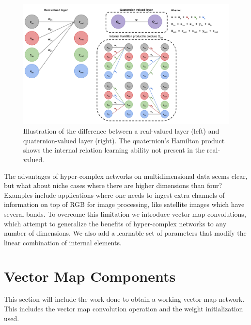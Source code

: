 \documentclass[14pt,a4paper]{article}
\begin{document}
\begin{figure}
	\centering
		\includegraphics[width=1.0\columnwidth]{figures/RealToQuaternion.pdf}
		\caption{Illustration of the difference between a real-valued layer (left) and quaternion-valued layer (right). The quaternion's Hamilton product shows the internal relation learning ability not present in the real-valued.}
	\label{f:hamilton}
\end{figure}

The advantages of hyper-complex networks on multidimensional data seems clear, but what about niche cases where there are higher dimensions than four?
Examples include applications where one needs to ingest extra channels of information on top of RGB for image processing, like satellite images which have several bands.
To overcome this limitation we introduce vector map convolutions, which attempt to generalize the benefits of hyper-complex networks to any number of dimensions.
We also add a learnable set of parameters that modify the linear combination of internal elements.


\section{Vector Map Components}
This section will include the work done to obtain a working vector map network.
This includes the vector map convolution operation and the weight initialization used.
\end{document}
